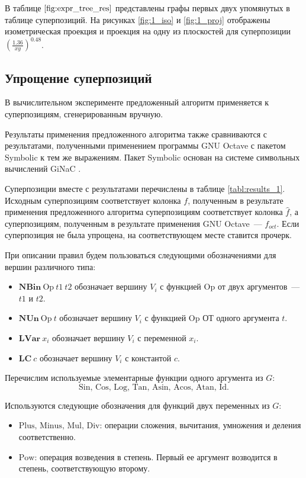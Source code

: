 \documentclass[12pt,a4paper]{article}
\begin{document}
В таблице $\ref{fig:expr_tree_res}$ представлены графы
первых двух упомянутых в таблице суперпозиций. На рисунках \ref{fig:1_iso} и
\ref{fig:1_proj} отображены изометрическая проекция и проекция на одну из
плоскостей для суперпозиции $\left(\frac{1.36}{xy}\right)^{0.48}$. 

\subsection{Упрощение суперпозиций}
\newcommand{\NBin}[1]{\mathbf{NBin}\ \text{#1}\ }
\newcommand{\NUn}[1]{\mathbf{NUn}\ \text{#1}\ }
\newcommand{\LVar}{\mathbf{LVar}\ }
\newcommand{\LC}{\mathbf{LC}\ }

В вычислительном эксперименте предложенный алгоритм применяется к
суперпозициям, сгенерированным вручную.

Результаты применения предложенного алгоритма также сравниваются с
результатами, полученными применением программы GNU Octave с пакетом Symbolic
\cite{SymbolicPackage} к тем же выражениям. Пакет Symbolic основан на системе
символьных вычислений GiNaC \cite{GinacSite}.

Суперпозиции вместе с результатами
перечислены в таблице \ref{tabl:results_1}. Исходным суперпозициям соответствует
колонка $f$, полученным в результате применения предложенного алгоритма
суперпозициям соответствует колонка $\hat{f}$, а суперпозициям, полученным в
результате применения GNU Octave~--- $f_{oct}$. Если суперпозиция не была
упрощена, на соответствующем месте ставится прочерк.

При описании правил будем пользоваться следующими обозначениями для вершин
различного типа:
\begin{itemize}
  \item $\NBin{Op} t1\ t2$ обозначает вершину $V_i$ с функцией $\text{Op}$ от двух
	аргументов~--- $t1$ и $t2$.
  \item $\NUn{Op} t$ обозначает вершину $V_i$ с функцией $\text{Op}$ ОТ одного
	аргумента $t$.
  \item $\LVar x_i$ обозначает вершину $V_i$ с переменной $x_i$.
  \item $\LC c$ обозначает вершину $V_i$ с константой $c$.
\end{itemize}

Перечислим используемые элементарные функции одного аргумента из $G$:
\[
\text{Sin, Cos, Log, Tan, Asin, Acos, Atan, Id.}
\]

Используются следующие обозначения для функций двух переменных из $G$:
\begin{itemize}
  \item $\text{Plus, Minus, Mul, Div}$: операции сложения, вычитания, умножения и
	деления соответственно.
  \item $\text{Pow}$: операция возведения в степень. Первый ее аргумент возводится в
	степень, соответствующую второму.
\end{itemize}
\end{document}

